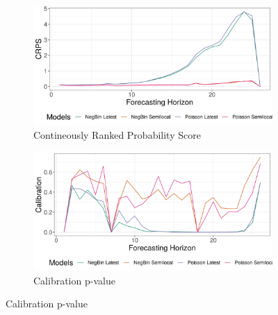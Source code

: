 \begin{figure}[H]
\begin{subfigure}{0.5\textwidth}
  \centering
  \includegraphics[width=\linewidth]{../output/Lolwa_crps.png}  
  \caption{Contineously Ranked Probability Score}
  \label{fig:sub-first}
\end{subfigure}
\begin{subfigure}{0.5\textwidth}
  \centering
  \includegraphics[width=\linewidth]{../output/Lolwa_calibration.png}  
  \caption{Calibration p-value}
  \label{fig:sub-second}
\end{subfigure}


\end{figure}
